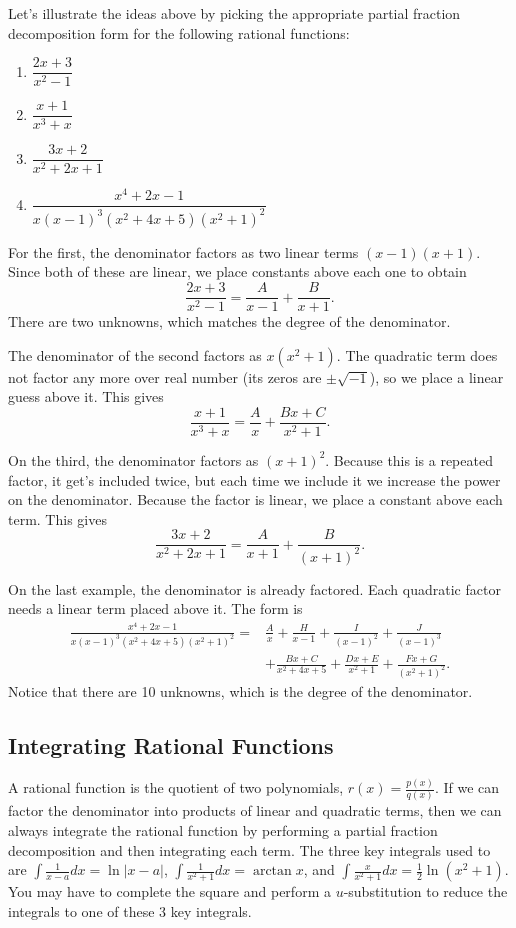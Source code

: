 \begin{example} Let's illustrate the ideas above by picking the appropriate partial fraction decomposition form for the following rational functions:
\begin{enumerate}
	\item $\dfrac{2x+3}{x^2-1}$
	\item $\dfrac{x+1}{x^3+x}$
	\item $\dfrac{3x+2}{x^2+2x+1}$
	\item $\dfrac{x^4+2x-1}{x(x-1)^3(x^2+4x+5)(x^2+1)^2}$
\end{enumerate}

For the first, the denominator factors as two linear terms $(x-1)(x+1)$. Since both of these are linear, we place constants above each one to obtain $$\frac{2x+3}{x^2-1} = \frac{A}{x-1}+\frac{B}{x+1}.$$ There are two unknowns, which matches the degree of the denominator.

The denominator of the second factors as $x(x^2+1)$.  The quadratic term does not factor any more over real number (its zeros are $\pm\sqrt{-1}$), so we place a linear guess above it.  This gives
$$\frac{x+1}{x^3+x} = \frac{A}{x}+\frac{Bx+C}{x^2+1}.$$

On the third, the denominator factors as $(x+1)^2$.  Because this is a repeated factor, it get's included twice, but each time we include it we increase the power on the denominator.  Because the factor is linear, we place a constant above each term. This gives $$\frac{3x+2}{x^2+2x+1} = \frac{A}{x+1}+\frac{B}{(x+1)^2}.$$

On the last example, the denominator is already factored.  Each quadratic factor needs a linear term placed above it.  The form is 
\begin{align*}
\frac{x^4+2x-1}{x(x-1)^3(x^2+4x+5)(x^2+1)^2}
=&
\frac{A}{x}+
\frac{H}{x-1}+
\frac{I}{(x-1)^2}+
\frac{J}{(x-1)^3}\\
&+\frac{Bx+C}{x^2+4x+5}+
\frac{Dx+E}{x^2+1}+
\frac{Fx+G}{(x^2+1)^2}.
\end{align*}
Notice that there are 10 unknowns, which is the degree of the denominator.

\end{example}





\subsection{Integrating Rational Functions}
A rational function is the quotient of two polynomials, $r(x) = \frac{p(x)}{q(x)}$. If we can factor the denominator into products of linear and quadratic terms, then we can always integrate the rational function by performing a partial fraction decomposition and then integrating each term.  The three key integrals used to are $\int \frac{1}{x-a}dx = \ln|x-a|$, $\int \frac{1}{x^2+1}dx = \arctan x$, and $\int \frac{x}{x^2+1}dx = \frac{1}{2}\ln(x^2+1)$. You may have to complete the square and perform a $u$-substitution to reduce the integrals to one of these 3 key integrals.
  

